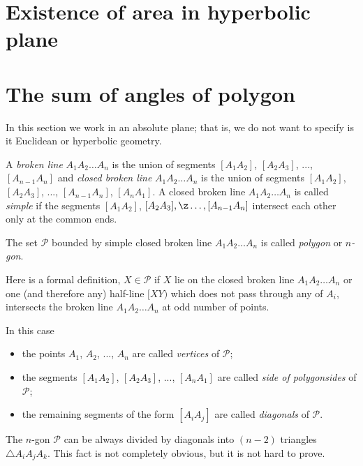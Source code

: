 \section*{Existence of area in hyperbolic plane}




\section*{The sum of angles of polygon} 

In this section we work in an absolute plane;
that is, we do not want to specify is it Euclidean or hyperbolic geometry.

A \emph{broken line} $A_1A_2\dots A_n$
is the union of segments $[A_1A_2]$, $[A_2A_3]$, ..., $[A_{n-1}A_n]$
and  \emph{closed broken line} $A_1A_2\dots A_n$
is the union of segments $[A_1A_2]$, $[A_2A_3]$, ..., $[A_{n-1}A_n]$, $[A_nA_1]$.
A closed broken line  $A_1A_2\dots A_n$ is called \emph{simple} if the segments  $[A_1A_2]$, $[A_2A_3], \z\dots,[A_{n-1}A_n]$ intersect each other only at the common ends.

The set $\mathcal{P}$ bounded by simple closed broken line $A_1A_2\dots A_n$ is called
\emph{polygon} or \emph{$n$-gon}.

Here is a formal definition, $X\in\mathcal{P}$ if $X$ lie on the closed broken line $A_1A_2\dots A_n$ or one (and therefore any) half-line $[XY)$ which does not pass through any of $A_i$, intersects the broken line $A_1A_2\dots A_n$ at odd number of points.

In this case
\begin{itemize}
\item the points $A_1$, $A_2$, ..., $A_n$ are called \emph{vertices} of $\mathcal{P}$;
\item the segments $[A_1A_2]$, $[A_2A_3]$, ..., $[A_{n}A_1]$ 
are called 
\emph{side of polygon}\emph{sides} of $\mathcal{P}$;
\item the remaining segments of the form $[A_iA_j]$ are called  
\emph{diagonals} of $\mathcal{P}$.
\end{itemize}

The  $n$-gon $\mathcal{P}$ can be always divided by diagonals into $(n-2)$ triangles $\triangle A_iA_jA_k$.
This fact is not completely obvious, but it is not hard to prove.

